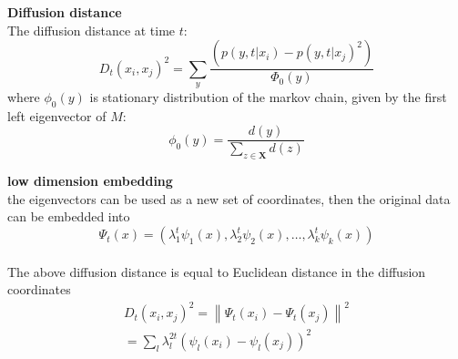 \documentclass{beamer}	%
\theoremstyle{plain}
\theoremstyle{definition}
\theoremstyle{remark}
\numberwithin{equation}{section}
\begin{document}
\begin{frame}
	\textbf{Diffusion distance}\\
	The diffusion distance at time $ t $:
	\[ D_t(x_i, x_j)^2 = \sum_{y} \dfrac{\left(p(y, t|x_i)-p(y, t|x_j)^2\right)}{\Phi_{0}(y)}\]
	where $ \phi_{0}(y) $ is stationary distribution of the markov chain, given by the first left eigenvector of $ M $:
	\[ \phi_{0}(y) = \dfrac{d(y)}{\sum_{z \in \mathbf{X}} d(z)} \]
\end{frame}

\begin{frame}
	\textbf{low dimension embedding}\\
	the eigenvectors can be used as a new set of coordinates, then the original data can be embedded into
	$$
	\Psi_{t}(x)=\left(\lambda_{1}^{t} \psi_{1}(x), \lambda_{2}^{t} \psi_{2}(x), \ldots, \lambda_{k}^{t} \psi_{k}(x)\right)
	$$
	\\
	The above diffusion distance is equal to Euclidean distance in the diffusion coordinates
	\begin{equation*}
		\begin{aligned}
			D_{t}\left(x_{i}, x_{j}\right)^{2}=\left\|\Psi_{t}\left(x_{i}\right)-\Psi_{t}\left(x_{j}\right)\right\|^{2}\\
		= \sum_{l} \lambda_{l}^{2 t}\left(\psi_{l}\left(x_{i}\right)-\psi_{l}\left(x_{j}\right)\right)^{2}
		\end{aligned}
	\end{equation*}

	
\end{frame}
\end{document}
